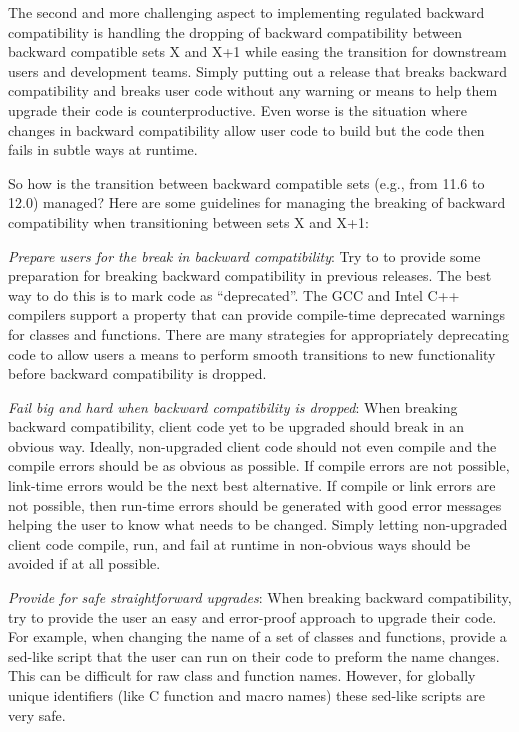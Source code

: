 \documentclass[11pt]{SANDreport}
\begin{document}
The second and more challenging aspect to implementing regulated
backward compatibility is handling the dropping of backward
compatibility between backward compatible sets X and X+1 while easing
the transition for downstream users and development teams.  Simply
putting out a release that breaks backward compatibility and breaks
user code without any warning or means to help them upgrade their code
is counterproductive.  Even worse is the situation where changes in
backward compatibility allow user code to build but the code then fails in
subtle ways at runtime.

So how is the transition between backward compatible sets (e.g., from
11.6 to 12.0) managed?  Here are some guidelines for managing the
breaking of backward compatibility when transitioning between sets X and X+1:

\begin{compactitem}

{}\item\textit{Prepare users for the break in backward compatibility}:
Try to to provide some preparation for breaking backward compatibility
in previous releases.  The best way to do this is to mark code as
``deprecated''.  The GCC and Intel C++ compilers support a
{} property that can provide compile-time
deprecated warnings for classes and functions.  There are many
strategies for appropriately deprecating code to allow users a means
to perform smooth transitions to new functionality before backward
compatibility is dropped.

{}\item\textit{Fail big and hard when backward compatibility is
dropped}: When breaking backward compatibility, client code yet to be
upgraded should break in an obvious way.  Ideally, non-upgraded client
code should not even compile and the compile errors should be as
obvious as possible.  If compile errors are not possible, link-time
errors would be the next best alternative.  If compile or link errors
are not possible, then run-time errors should be generated with good
error messages helping the user to know what needs to be changed.
Simply letting non-upgraded client code compile, run, and fail at
runtime in non-obvious ways should be avoided if at all possible.

{}\item\textit{Provide for safe straightforward upgrades}: When
breaking backward compatibility, try to provide the user an easy and
error-proof approach to upgrade their code.  For example, when
changing the name of a set of classes and functions, provide a
sed-like script that the user can run on their code to preform the
name changes.  This can be difficult for raw class and function names.
However, for globally unique identifiers (like C function and macro
names) these sed-like scripts are very safe.

\end{compactitem}
\end{document}
